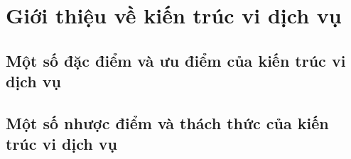 \documentclass{report} %
\begin{document}
% 
% 
% 
% 

% 

\chapter{Giới thiệu về kiến trúc vi dịch vụ}
% 
% 
% 
\section{Một số đặc điểm và ưu điểm của kiến trúc vi dịch vụ}














\section{Một số nhược điểm và thách thức của kiến trúc vi dịch vụ}
\end{document}
